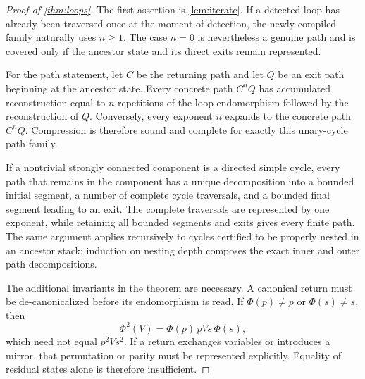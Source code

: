 \documentclass[11pt]{article}
\begin{document}
\begin{proof}[Proof of \cref{thm:loops}]
The first assertion is \cref{lem:iterate}. If a detected loop has already been traversed once at the moment of detection, the newly compiled family naturally uses $n\ge1$. The case $n=0$ is nevertheless a genuine path and is covered only if the ancestor state and its direct exits remain represented.

For the path statement, let $C$ be the returning path and let $Q$ be an exit path beginning at the ancestor state. Every concrete path $C^nQ$ has accumulated reconstruction equal to $n$ repetitions of the loop endomorphism followed by the reconstruction of $Q$. Conversely, every exponent $n$ expands to the concrete path $C^nQ$. Compression is therefore sound and complete for exactly this unary-cycle path family.

If a nontrivial strongly connected component is a directed simple cycle, every path that remains in the component has a unique decomposition into a bounded initial segment, a number of complete cycle traversals, and a bounded final segment leading to an exit. The complete traversals are represented by one exponent, while retaining all bounded segments and exits gives every finite path. The same argument applies recursively to cycles certified to be properly nested in an ancestor stack: induction on nesting depth composes the exact inner and outer path decompositions.

The additional invariants in the theorem are necessary. A canonical return must be de-canonicalized before its endomorphism is read. If $\Phi(p)\ne p$ or $\Phi(s)\ne s$, then
\[
  \Phi^2(V)=\Phi(p)\,pVs\,\Phi(s),
\]
which need not equal $p^2Vs^2$. If a return exchanges variables or introduces a mirror, that permutation or parity must be represented explicitly. Equality of residual states alone is therefore insufficient.
\end{proof}
\end{document}
